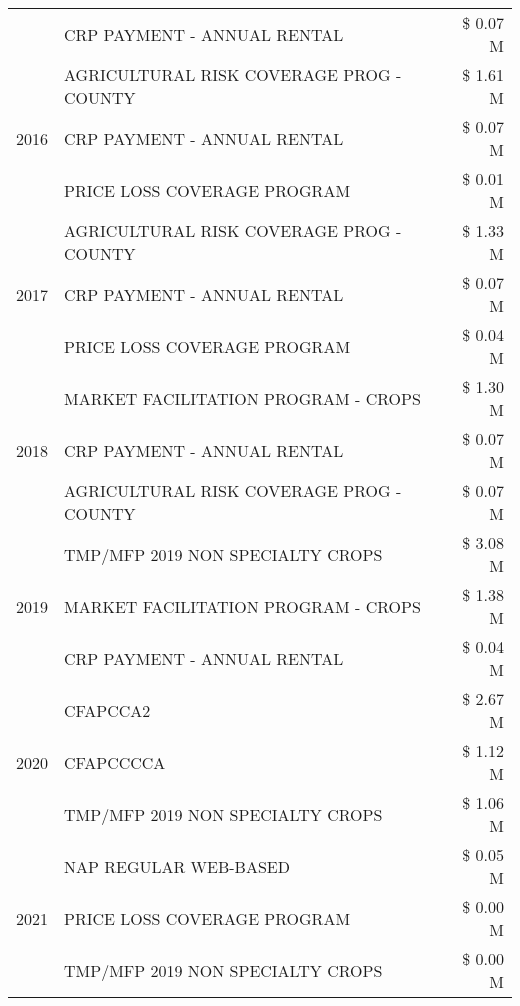 \begin{tabular}{llr}
 & CRP PAYMENT - ANNUAL RENTAL & \$ 0.07 M \\
\cline{1-3}
\multirow[t]{3}{*}{2016} & AGRICULTURAL RISK COVERAGE PROG - COUNTY & \$ 1.61 M \\
 & CRP PAYMENT - ANNUAL RENTAL & \$ 0.07 M \\
 & PRICE LOSS COVERAGE PROGRAM & \$ 0.01 M \\
\cline{1-3}
\multirow[t]{3}{*}{2017} & AGRICULTURAL RISK COVERAGE PROG - COUNTY & \$ 1.33 M \\
 & CRP PAYMENT - ANNUAL RENTAL & \$ 0.07 M \\
 & PRICE LOSS COVERAGE PROGRAM & \$ 0.04 M \\
\cline{1-3}
\multirow[t]{3}{*}{2018} & MARKET FACILITATION PROGRAM - CROPS & \$ 1.30 M \\
 & CRP PAYMENT - ANNUAL RENTAL & \$ 0.07 M \\
 & AGRICULTURAL RISK COVERAGE PROG - COUNTY & \$ 0.07 M \\
\cline{1-3}
\multirow[t]{3}{*}{2019} & TMP/MFP 2019 NON SPECIALTY CROPS & \$ 3.08 M \\
 & MARKET FACILITATION PROGRAM - CROPS & \$ 1.38 M \\
 & CRP PAYMENT - ANNUAL RENTAL & \$ 0.04 M \\
\cline{1-3}
\multirow[t]{3}{*}{2020} & CFAPCCA2 & \$ 2.67 M \\
 & CFAPCCCCA & \$ 1.12 M \\
 & TMP/MFP 2019 NON SPECIALTY CROPS & \$ 1.06 M \\
\cline{1-3}
\multirow[t]{3}{*}{2021} & NAP REGULAR WEB-BASED & \$ 0.05 M \\
 & PRICE LOSS COVERAGE PROGRAM & \$ 0.00 M \\
 & TMP/MFP 2019 NON SPECIALTY CROPS & \$ 0.00 M \\
\cline{1-3}
\bottomrule
\end{tabular}
